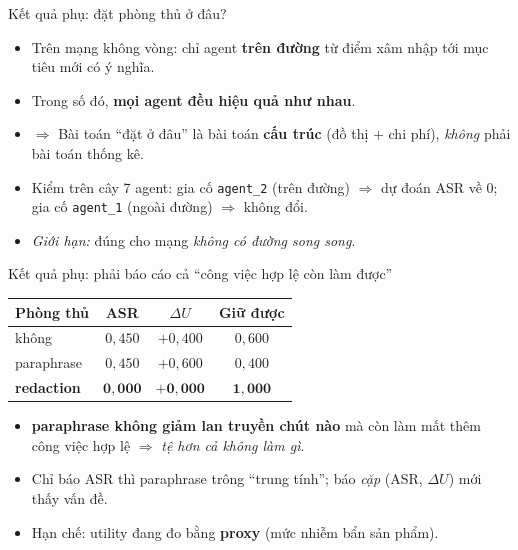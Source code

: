 \documentclass[aspectratio=169,11pt]{beamer}
\begin{document}
\begin{frame}{Kết quả phụ: đặt phòng thủ ở đâu?}
  \begin{itemize}
    \item Trên mạng không vòng: chỉ agent \textbf{trên đường} từ điểm xâm nhập tới mục
          tiêu mới có ý nghĩa.
    \item Trong số đó, \textbf{mọi agent đều hiệu quả như nhau}.
    \item $\Rightarrow$ Bài toán ``đặt ở đâu'' là bài toán \textbf{cấu trúc}
          (đồ thị + chi phí), \emph{không} phải bài toán thống kê.
    \item Kiểm trên cây 7 agent: gia cố \texttt{agent\_2} (trên đường) $\Rightarrow$ dự
          đoán ASR về $0$; gia cố \texttt{agent\_1} (ngoài đường) $\Rightarrow$ không đổi.
    \item \emph{Giới hạn:} đúng cho mạng \emph{không có đường song song}.
  \end{itemize}
\end{frame}

\begin{frame}{Kết quả phụ: phải báo cáo cả ``công việc hợp lệ còn làm được''}
  \begin{center}
  \small
  \begin{tabular}{|l|c|c|c|}
  \hline
  \textbf{Phòng thủ} & \textbf{ASR} & \textbf{$\Delta U$} & \textbf{Giữ được}\\
  \hline
  không & $0{,}450$ & $+0{,}400$ & $0{,}600$\\
  paraphrase & $0{,}450$ & $+0{,}600$ & $0{,}400$\\
  \textbf{redaction} & $\mathbf{0{,}000}$ & $\mathbf{+0{,}000}$ & $\mathbf{1{,}000}$\\
  \hline
  \end{tabular}
  \end{center}
  \begin{itemize}
    \item \textbf{paraphrase không giảm lan truyền chút nào} mà còn làm mất thêm công
          việc hợp lệ $\Rightarrow$ \emph{tệ hơn cả không làm gì}.
    \item Chỉ báo ASR thì paraphrase trông ``trung tính''; báo \emph{cặp} (ASR, $\Delta U$)
          mới thấy vấn đề.
    \item Hạn chế: utility đang đo bằng \textbf{proxy} (mức nhiễm bẩn sản phẩm).
  \end{itemize}
\end{frame}
\end{document}
